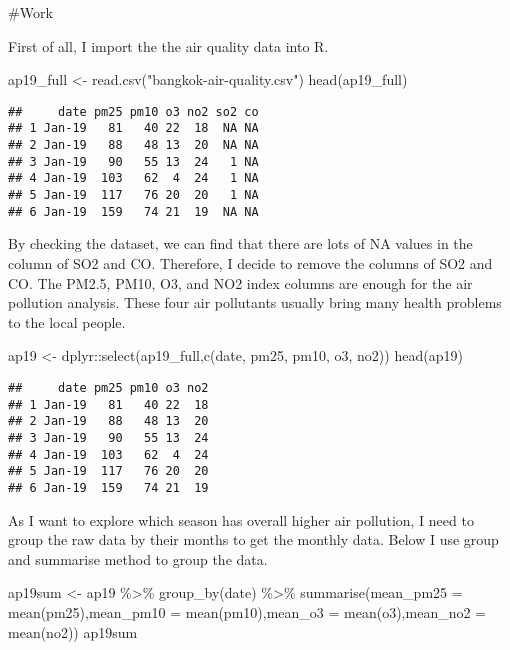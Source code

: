 \documentclass[
]{article}
\newenvironment{Shaded}{\begin{snugshade}}{\end{snugshade}}
\newcommand{\AttributeTok}[1]{\textcolor[rgb]{0.77,0.63,0.00}{#1}}
\newcommand{\FunctionTok}[1]{\textcolor[rgb]{0.00,0.00,0.00}{#1}}
\newcommand{\NormalTok}[1]{#1}
\newcommand{\OtherTok}[1]{\textcolor[rgb]{0.56,0.35,0.01}{#1}}
\newcommand{\SpecialCharTok}[1]{\textcolor[rgb]{0.00,0.00,0.00}{#1}}
\newcommand{\StringTok}[1]{\textcolor[rgb]{0.31,0.60,0.02}{#1}}
\begin{document}
\#Work

First of all, I import the the air quality data into R.

\begin{Shaded}
\begin{Highlighting}[]
\NormalTok{ap19\_full }\OtherTok{\textless{}{-}} \FunctionTok{read.csv}\NormalTok{(}\StringTok{"bangkok{-}air{-}quality.csv"}\NormalTok{)}
\FunctionTok{head}\NormalTok{(ap19\_full)}
\end{Highlighting}
\end{Shaded}

\begin{verbatim}
##     date pm25 pm10 o3 no2 so2 co
## 1 Jan-19   81   40 22  18  NA NA
## 2 Jan-19   88   48 13  20  NA NA
## 3 Jan-19   90   55 13  24   1 NA
## 4 Jan-19  103   62  4  24   1 NA
## 5 Jan-19  117   76 20  20   1 NA
## 6 Jan-19  159   74 21  19  NA NA
\end{verbatim}

By checking the dataset, we can find that there are lots of NA values in
the column of SO2 and CO. Therefore, I decide to remove the columns of
SO2 and CO. The PM2.5, PM10, O3, and NO2 index columns are enough for
the air pollution analysis. These four air pollutants usually bring many
health problems to the local people.

\begin{Shaded}
\begin{Highlighting}[]
\NormalTok{ap19 }\OtherTok{\textless{}{-}}\NormalTok{ dplyr}\SpecialCharTok{::}\FunctionTok{select}\NormalTok{(ap19\_full,}\FunctionTok{c}\NormalTok{(date, pm25, pm10, o3, no2))}
\FunctionTok{head}\NormalTok{(ap19)}
\end{Highlighting}
\end{Shaded}

\begin{verbatim}
##     date pm25 pm10 o3 no2
## 1 Jan-19   81   40 22  18
## 2 Jan-19   88   48 13  20
## 3 Jan-19   90   55 13  24
## 4 Jan-19  103   62  4  24
## 5 Jan-19  117   76 20  20
## 6 Jan-19  159   74 21  19
\end{verbatim}

As I want to explore which season has overall higher air pollution, I
need to group the raw data by their months to get the monthly data.
Below I use group and summarise method to group the data.

\begin{Shaded}
\begin{Highlighting}[]
\NormalTok{ap19sum }\OtherTok{\textless{}{-}}\NormalTok{ ap19 }\SpecialCharTok{\%\textgreater{}\%}
  \FunctionTok{group\_by}\NormalTok{(date) }\SpecialCharTok{\%\textgreater{}\%}
  \FunctionTok{summarise}\NormalTok{(}\AttributeTok{mean\_pm25 =} \FunctionTok{mean}\NormalTok{(pm25),}\AttributeTok{mean\_pm10 =} \FunctionTok{mean}\NormalTok{(pm10),}\AttributeTok{mean\_o3 =} \FunctionTok{mean}\NormalTok{(o3),}\AttributeTok{mean\_no2 =} \FunctionTok{mean}\NormalTok{(no2))}
\NormalTok{ap19sum}
\end{Highlighting}
\end{Shaded}
\end{document}
